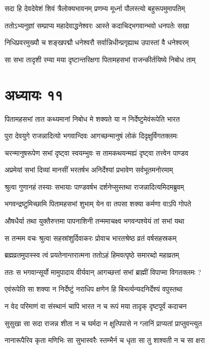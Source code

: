 \twolineshloka
{सदा हि देवदेवेशं शिवं त्रैलोक्यभावनम्}
{प्रणम्य मूर्ध्ना पौलस्त्यो बहुरूपमुमापतिम्}


\twolineshloka
{ततोऽभ्यनुज्ञां सम्प्राप्य महादेवाद्धनेश्वरः}
{आस्ते कदाचिद्भगवान्भवो धनपतेः सखा}


\twolineshloka
{निधिप्रवरमुख्यौ च शङ्खपद्मौ धनेश्वरौ}
{सर्वान्निधीन्प्रगृह्याथ उपास्तां वै धनेश्वरम्}


\twolineshloka
{सा सभा तादृशी रम्या मया दृष्टान्तरिक्षगा}
{पितामहसभां राजन्कीर्तयिष्ये निबोध ताम्}


\chapter{अध्यायः ११}
\twolineshloka
{पितामहसभां तात कथ्यमानां निबोध मे}
{शक्यते या न निर्देष्टुमेवंरूपेति भारत}


\twolineshloka
{पुरा देवयुगे राजन्नादित्यो भगवान्दिवः}
{आगच्छन्मानुषं लोकं दिदृक्षुर्विगतक्लमः}


\twolineshloka
{चरन्मानुषरूपेण सभां दृष्ट्वा स्वयम्भुवः}
{स तामकथयन्मह्यं दृष्ट्वा तत्त्वेन पाण्डव}


\twolineshloka
{अप्रमेयां सभां दिव्यां मानसीं भरतर्षभ}
{अनिर्देश्यां प्रभावेण सर्वभूतमनोरमाम्}


\threelineshloka
{श्रुत्वा गुणानहं तस्याः सभायाः पाण्डवर्षभ}
{दर्शनेप्सुस्तथा राजन्नादित्यमिदमब्रुवम्}
{}


\twolineshloka
{भगवन्द्रष्टुमिच्छामि पितामहसभां शुभाम्}
{येन वा तपसा शक्या कर्मणा वाऽपि गोपते}


\twolineshloka
{औषधैर्या तथा युक्तैरुत्तमा पापनाशिनी}
{तन्ममाचक्ष्व भगवन्पश्येयं तां सभां यथा}


\twolineshloka
{स तन्मम वचः श्रुत्वा सहस्रांशुर्दिवाकरः}
{प्रोवाच भारतश्रेष्ठ व्रतं वर्षसहस्रकम्}


\twolineshloka
{ब्रह्मव्रतमुपास्स्व त्वं प्रयतेनान्तरात्मना}
{ततोऽहं हिमवत्पृष्ठे समारब्दो महाव्रतम्}


\twolineshloka
{ततः स भगवान्सूर्यो मामुपादाय वीर्यवान्}
{आगच्छत्तां सभां ब्राह्मीं विपाप्मा विगतक्लमः ?}


\twolineshloka
{एवंरूपेति सा शक्या न निर्देष्टुं नराधिप}
{क्षणेन हि बिभर्त्यन्यदनिर्देश्यं वपुस्तथा}


\twolineshloka
{न वेद परिमाणं वा संस्थानं चापि भारत}
{न च रूपं मया तादृक् दृष्टपूर्वं कदाचन}


\twolineshloka
{सुसुखा सा सदा राजन्न शीता न च घर्मदा}
{न क्षुत्पिपासे न ग्लानिं प्राप्यतां प्राप्तुवन्त्युत}


\twolineshloka
{नानारूपैरिव कृता मणिभिः सा सुभास्वरैः}
{स्तम्भैर्न च धृता सा तु शाश्वती न च सा क्षरा}


